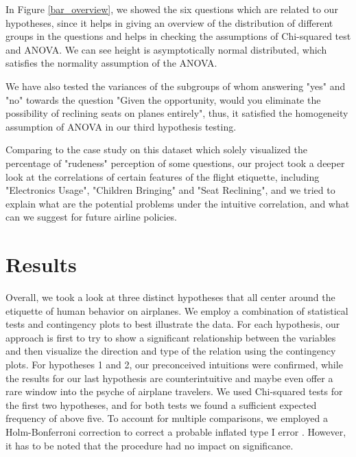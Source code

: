 \documentclass{article}
\theoremstyle{plain}
\theoremstyle{definition}
\theoremstyle{remark}
\begin{document}
In Figure \ref{bar_overview}, we showed the six questions which are related to our hypotheses, since it helps in giving an overview of the distribution of different groups in the questions and helps in checking the assumptions of Chi-squared test and ANOVA. We can see height is asymptotically normal distributed, which satisfies the normality assumption of the ANOVA. 

We have also tested the variances of the subgroups of whom answering "yes" and "no" towards the question "Given the opportunity, would you eliminate the possibility of reclining seats on planes entirely", thus, it satisfied the homogeneity assumption of ANOVA in our third hypothesis testing.

Comparing to the case study \citep{relatedwork} on this dataset which solely visualized the percentage of "rudeness" perception of some questions, our project took a deeper look at the correlations of certain features of the flight etiquette, including "Electronics Usage", "Children Bringing" and "Seat Reclining", and we tried to explain what are the potential problems under the intuitive correlation, and what can we suggest for future airline policies.


% 

\section{Results}\label{sec:results}
Overall, we took a look at three distinct hypotheses that all center around the etiquette of human behavior on airplanes. We employ a combination of statistical tests and contingency plots to best illustrate the data. For each hypothesis, our approach is first to try to show a significant relationship between the variables and then visualize the direction and type of the relation using the contingency plots. For hypotheses 1 and 2, our preconceived intuitions were confirmed, while the results for our last hypothesis are counterintuitive and maybe even offer a rare window into the psyche of airplane travelers. We used Chi-squared tests for the first two hypotheses, and for both tests we found a sufficient expected frequency of above five. To account for multiple comparisons, we employed a Holm-Bonferroni correction to correct a probable inflated type I error \citep{holm-bonferroni}. However, it has to be noted that the procedure had no impact on significance.
\end{document}
